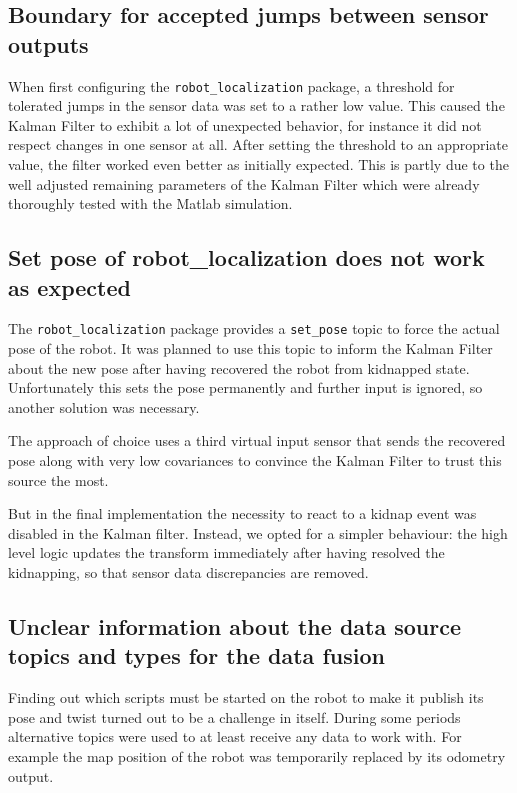\subsection{Boundary for accepted jumps between sensor outputs}
When first configuring the \texttt{robot\_localization} package, a threshold for tolerated jumps in the sensor data was set to a rather low value. This caused the Kalman Filter to exhibit a lot of unexpected behavior, for instance it did not respect changes in one sensor at all. After setting the threshold to an appropriate value, the filter worked even better as initially expected. This is partly due to the well adjusted remaining parameters of the Kalman Filter which were already thoroughly tested with the Matlab simulation.

\subsection{Set pose of robot\_localization does not work as expected}
The \texttt{robot\_localization} package provides a \texttt{set\_pose} topic to force the actual pose of the robot. It was planned to use this topic to inform the Kalman Filter about the new pose after having recovered the robot from kidnapped state. Unfortunately this sets the pose permanently and further input is ignored, so another solution was necessary.

The approach of choice uses a third virtual input sensor that sends the recovered pose along with very low covariances to convince the Kalman Filter to trust this source the most.

But in the final implementation the necessity to react to a kidnap event was disabled in the Kalman filter. Instead, we opted for a simpler behaviour: the high level logic updates the transform immediately after having resolved the kidnapping, so that sensor data discrepancies are removed. 

\subsection{Unclear information about the data source topics and types for the data fusion}
Finding out which scripts must be started on the robot to make it publish its pose and twist turned out to be a challenge in itself. During some periods alternative topics were used to at least receive any data to work with. For example the map position of the robot was temporarily replaced by its odometry output.